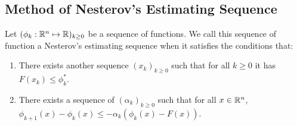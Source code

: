 \documentclass[12pt]{article}
\begin{document}
    \subsection{Method of Nesterov's Estimating Sequence}
        \begin{definition}\label{def:nes-est-seq}
            Let $(\phi_k : \mathbb R^n \mapsto \mathbb R)_{k \ge 0}$ be a sequence of functions. 
            We call this sequence of function a Nesterov's estimating sequence when it satisfies the conditions that: 
            \begin{enumerate}
                \item There exists another sequence $(x_k)_{k \ge 0}$ such that for all $k \ge 0$ it has $F(x_k) \le \phi_k^*$. 
                \item There exists a sequence of $(\alpha_k)_{k \ge 0}$ such that for all $x \in \mathbb R^n$, $\phi_{k + 1}(x) - \phi_k(x) \le - \alpha_k(\phi_k(x) - F(x))$. 
            \end{enumerate}
        \end{definition}
\end{document}
